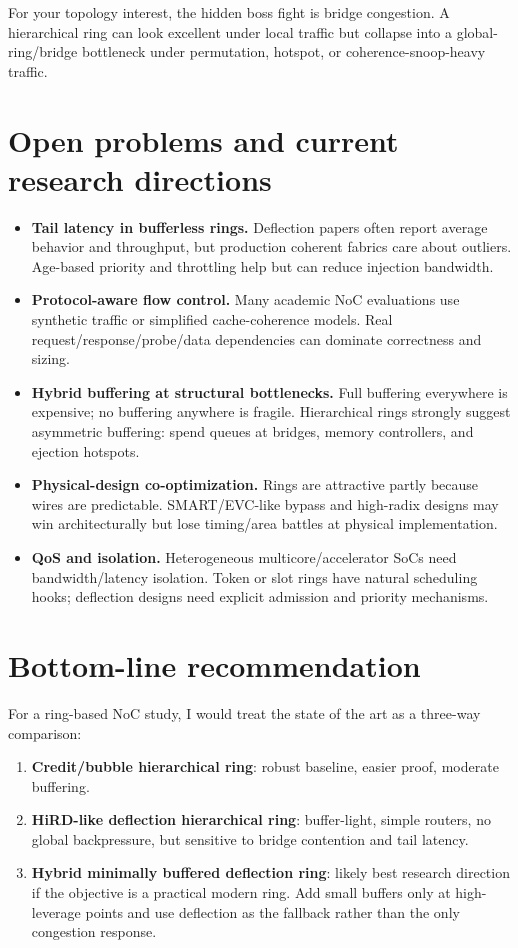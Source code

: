 \documentclass[11pt]{article}
\newcommand{\term}[1]{\textbf{#1}}
\begin{document}
For your topology interest, the hidden boss fight is bridge congestion. A hierarchical ring can look excellent under local traffic but collapse into a global-ring/bridge bottleneck under permutation, hotspot, or coherence-snoop-heavy traffic.

\section{Open problems and current research directions}

\begin{itemize}
  \item \term{Tail latency in bufferless rings.} Deflection papers often report average behavior and throughput, but production coherent fabrics care about outliers. Age-based priority and throttling help but can reduce injection bandwidth.
  \item \term{Protocol-aware flow control.} Many academic NoC evaluations use synthetic traffic or simplified cache-coherence models. Real request/response/probe/data dependencies can dominate correctness and sizing.
  \item \term{Hybrid buffering at structural bottlenecks.} Full buffering everywhere is expensive; no buffering anywhere is fragile. Hierarchical rings strongly suggest asymmetric buffering: spend queues at bridges, memory controllers, and ejection hotspots.
  \item \term{Physical-design co-optimization.} Rings are attractive partly because wires are predictable. SMART/EVC-like bypass and high-radix designs may win architecturally but lose timing/area battles at physical implementation.
  \item \term{QoS and isolation.} Heterogeneous multicore/accelerator SoCs need bandwidth/latency isolation. Token or slot rings have natural scheduling hooks; deflection designs need explicit admission and priority mechanisms.
\end{itemize}

\section{Bottom-line recommendation}

For a ring-based NoC study, I would treat the state of the art as a three-way comparison:

\begin{enumerate}
  \item \term{Credit/bubble hierarchical ring}: robust baseline, easier proof, moderate buffering.
  \item \term{HiRD-like deflection hierarchical ring}: buffer-light, simple routers, no global backpressure, but sensitive to bridge contention and tail latency.
  \item \term{Hybrid minimally buffered deflection ring}: likely best research direction if the objective is a practical modern ring. Add small buffers only at high-leverage points and use deflection as the fallback rather than the only congestion response.
\end{enumerate}
\end{document}
